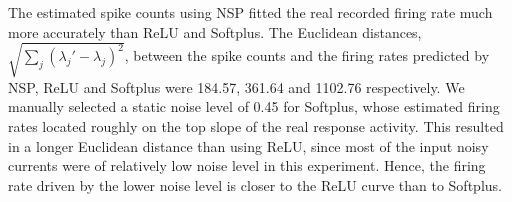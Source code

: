 	The estimated spike counts using NSP fitted the real recorded firing rate much more accurately than ReLU and Softplus.
	The Euclidean distances, $\sqrt{\sum_{j}(\lambda_j' - \lambda_j)^2}$, between the spike counts and the firing rates predicted by NSP, ReLU and Softplus were 184.57, 361.64 and 1102.76 respectively.
	We manually selected a static noise level of 0.45 for Softplus, whose estimated firing rates located roughly on the top slope of the real response activity.
	This resulted in a longer Euclidean distance than using ReLU, since most of the input noisy currents were of relatively low noise level in this experiment.
	Hence, the firing rate driven by the lower noise level is closer to the ReLU curve than to Softplus.
			
